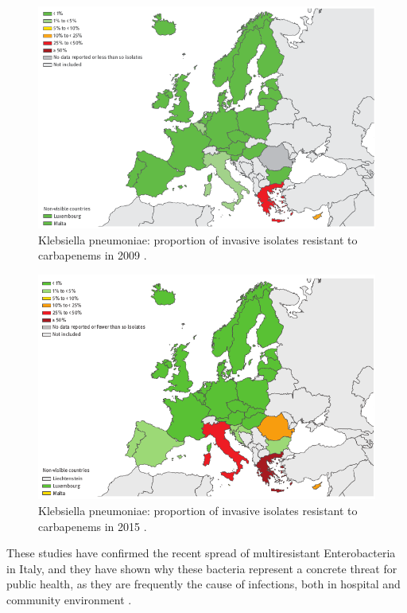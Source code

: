 \documentclass[11pt]{report}
\begin{document}
\begin{figure}[htp]
\centering
\includegraphics[scale=0.60]{immagini gamalero/K.pneu_2009.png}
\caption{Klebsiella pneumoniae: proportion of invasive isolates resistant to carbapenems in 2009 \cite{ECDC_Surveillance}.}
\label{}
\end{figure}

\clearpage
\begin{figure}[htp]
\centering
\includegraphics[scale=0.60]{immagini gamalero/K.pneu_2015.png}
\caption{Klebsiella pneumoniae: proportion of invasive isolates resistant to carbapenems in 2015 \cite{ECDC_Surveillance}.}
\label{}
\end{figure}

These studies have confirmed the recent spread of multiresistant Enterobacteria in Italy, and they have shown why these bacteria represent a concrete threat for public health, as they are frequently the cause of infections, both in hospital and community environment \cite{circolare2013}.
\end{document}
